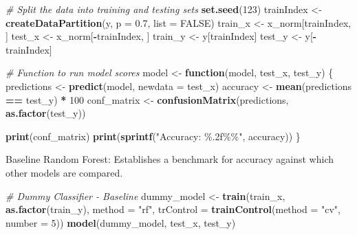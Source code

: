 \documentclass[
]{article}
\newenvironment{Shaded}{\begin{snugshade}}{\end{snugshade}}
\newcommand{\AttributeTok}[1]{\textcolor[rgb]{0.13,0.29,0.53}{#1}}
\newcommand{\CommentTok}[1]{\textcolor[rgb]{0.56,0.35,0.01}{\textit{#1}}}
\newcommand{\ConstantTok}[1]{\textcolor[rgb]{0.56,0.35,0.01}{#1}}
\newcommand{\ControlFlowTok}[1]{\textcolor[rgb]{0.13,0.29,0.53}{\textbf{#1}}}
\newcommand{\DecValTok}[1]{\textcolor[rgb]{0.00,0.00,0.81}{#1}}
\newcommand{\FloatTok}[1]{\textcolor[rgb]{0.00,0.00,0.81}{#1}}
\newcommand{\FunctionTok}[1]{\textcolor[rgb]{0.13,0.29,0.53}{\textbf{#1}}}
\newcommand{\NormalTok}[1]{#1}
\newcommand{\OtherTok}[1]{\textcolor[rgb]{0.56,0.35,0.01}{#1}}
\newcommand{\SpecialCharTok}[1]{\textcolor[rgb]{0.81,0.36,0.00}{\textbf{#1}}}
\newcommand{\StringTok}[1]{\textcolor[rgb]{0.31,0.60,0.02}{#1}}
\begin{document}
\begin{Shaded}
\begin{Highlighting}[]
\CommentTok{\# Split the data into training and testing sets}
\FunctionTok{set.seed}\NormalTok{(}\DecValTok{123}\NormalTok{)}
\NormalTok{trainIndex }\OtherTok{\textless{}{-}} \FunctionTok{createDataPartition}\NormalTok{(y, }\AttributeTok{p =} \FloatTok{0.7}\NormalTok{, }\AttributeTok{list =} \ConstantTok{FALSE}\NormalTok{)}
\NormalTok{train\_x }\OtherTok{\textless{}{-}}\NormalTok{ x\_norm[trainIndex, ]}
\NormalTok{test\_x }\OtherTok{\textless{}{-}}\NormalTok{ x\_norm[}\SpecialCharTok{{-}}\NormalTok{trainIndex, ]}
\NormalTok{train\_y }\OtherTok{\textless{}{-}}\NormalTok{ y[trainIndex]}
\NormalTok{test\_y }\OtherTok{\textless{}{-}}\NormalTok{ y[}\SpecialCharTok{{-}}\NormalTok{trainIndex]}

\CommentTok{\# Function to run model scores}
\NormalTok{model }\OtherTok{\textless{}{-}} \ControlFlowTok{function}\NormalTok{(model, test\_x, test\_y) \{}
\NormalTok{  predictions }\OtherTok{\textless{}{-}} \FunctionTok{predict}\NormalTok{(model, }\AttributeTok{newdata =}\NormalTok{ test\_x)}
\NormalTok{  accuracy }\OtherTok{\textless{}{-}} \FunctionTok{mean}\NormalTok{(predictions }\SpecialCharTok{==}\NormalTok{ test\_y) }\SpecialCharTok{*} \DecValTok{100}
\NormalTok{  conf\_matrix }\OtherTok{\textless{}{-}} \FunctionTok{confusionMatrix}\NormalTok{(predictions, }\FunctionTok{as.factor}\NormalTok{(test\_y))}
  
  \FunctionTok{print}\NormalTok{(conf\_matrix)}
  \FunctionTok{print}\NormalTok{(}\FunctionTok{sprintf}\NormalTok{(}\StringTok{"Accuracy: \%.2f\%\%"}\NormalTok{, accuracy))}
\NormalTok{\}}
\end{Highlighting}
\end{Shaded}

Baseline Random Forest: Establishes a benchmark for accuracy against
which other models are compared.

\begin{Shaded}
\begin{Highlighting}[]
\CommentTok{\# Dummy Classifier {-} Baseline}
\NormalTok{dummy\_model }\OtherTok{\textless{}{-}} \FunctionTok{train}\NormalTok{(train\_x, }\FunctionTok{as.factor}\NormalTok{(train\_y), }\AttributeTok{method =} \StringTok{"rf"}\NormalTok{, }\AttributeTok{trControl =} \FunctionTok{trainControl}\NormalTok{(}\AttributeTok{method =} \StringTok{"cv"}\NormalTok{, }\AttributeTok{number =} \DecValTok{5}\NormalTok{))}
\FunctionTok{model}\NormalTok{(dummy\_model, test\_x, test\_y)}
\end{Highlighting}
\end{Shaded}
\end{document}
